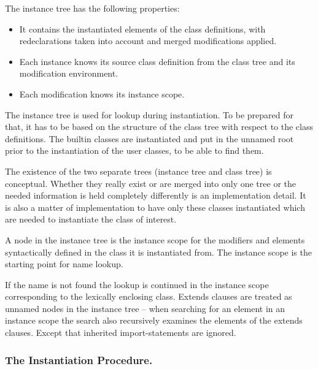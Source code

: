 The instance tree has the following properties:
\begin{itemize}
\item
  It contains the instantiated elements of the class definitions, with
  redeclarations taken into account and merged modifications applied.
\end{itemize}

\begin{itemize}
\item
  Each instance knows its source class definition from the class tree
  and its modification environment.
\item
  Each modification knows its instance scope.
\end{itemize}

The instance tree is used for lookup during instantiation. To be
prepared for that, it has to be based on the structure of the class tree
with respect to the class definitions. The builtin classes are
instantiated and put in the unnamed root prior to the instantiation of
the user classes, to be able to find them.

\begin{nonnormative}
The existence of the two separate trees (instance tree and
class tree) is conceptual. Whether they really exist or are merged into
only one tree or the needed information is held completely differently
is an implementation detail. It is also a matter of implementation to
have only these classes instantiated which are needed to instantiate the
class of interest.
\end{nonnormative}

A node in the instance tree is the instance scope for the modifiers and
elements syntactically defined in the class it is instantiated from. The
instance scope is the starting point for name lookup.

\begin{nonnormative}
If the name is not found the lookup is continued in the instance scope corresponding to the lexically enclosing class.  Extends clauses are treated as unnamed nodes in the
instance tree -- when searching for an element in an instance scope the search also recursively examines the elements of the extends clauses.  Except that inherited
import-statements are ignored.
\end{nonnormative}

\subsubsection{The Instantiation Procedure.}\label{the-instantiation-procedure}

